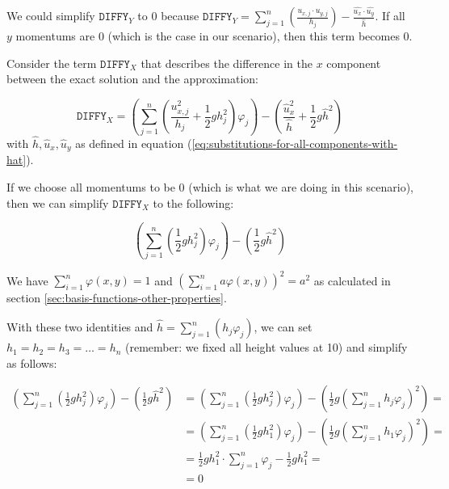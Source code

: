 \documentclass{article}
\renewcommand{\phi}{\varphi}
\begin{document}
We could simplify $\mathtt{DIFFY}_Y$ to 0 because $\mathtt{DIFFY}_Y=\sum_{j=1}^n\left( \frac{u_{x,j}\cdot u_{y,j}}{h_j} \right)-\frac{\widehat{u_x}\cdot\widehat{u_y}}{\widehat{h}}$. If all $y$ momentums are 0 (which is the case in our scenario), then this term becomes 0.

Consider the term $\mathtt{DIFFY}_X$ that describes the difference in the $x$ component between the exact solution and the approximation:

\begin{equation*}
  \mathtt{DIFFY}_X = \left( \sum_{j=1}^n \left(\frac{u_{x,j}^2}{h_j} + \frac{1}{2} g h_j^2\right) \phi_j \right) - \left( \frac{\widehat{u}_x^2}{\widehat h} + \frac{1}{2} g \widehat{h}^2\right)
\end{equation*}
with $\widehat h, \widehat{u}_x, \widehat{u}_y$ as defined in equation (\ref{eq:substitutions-for-all-components-with-hat}).

If we choose all momentums to be 0 (which is what we are doing in this scenario), then we can simplify $\mathtt{DIFFY}_X$ to the following:

\begin{equation*}
  \left( \sum_{j=1}^n \left(\frac{1}{2} g h_j^2\right) \phi_j \right) - \left( \frac{1}{2} g \widehat{h}^2\right)
\end{equation*}


We have $\sum_{i=1}^n \phi(x,y)=1$ and  $(\sum_{i=1}^n a \phi(x,y))^2 = a^2$ as calculated in section \ref{sec:basis-functions-other-properties}.

With these two identities and $\widehat{h}=\sum_{j=1}^n \left(h_j \phi_j\right)$, we can set $h_1=h_2=h_3=\dots=h_n$ (remember: we fixed all height values at 10) and simplify as follows:

\begin{align*}
  \left( \sum_{j=1}^n \left(\frac{1}{2} g h_j^2\right) \phi_j \right) - \left( \frac{1}{2} g \widehat{h}^2\right) &= \left( \sum_{j=1}^n \left(\frac{1}{2} g h_j^2\right) \phi_j \right) - \left( \frac{1}{2} g \left( \sum_{j=1}^n h_j\phi_j \right)^2\right) = \\
  &= \left( \sum_{j=1}^n \left(\frac{1}{2} g h_1^2\right) \phi_j \right) - \left( \frac{1}{2} g \left( \sum_{j=1}^n h_1\phi_j \right)^2\right) = \\
  &= \frac{1}{2} g h_1^2 \cdot \sum_{j=1}^n \phi_j - \frac{1}{2} g h_1^2 = \\
  &= 0
\end{align*}
\end{document}
